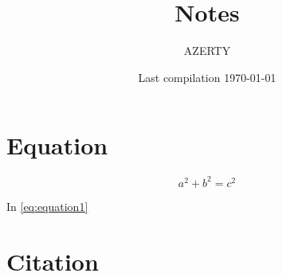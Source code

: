 \documentclass{article}
\begin{document}

\title{Notes
}

\author{AZERTY}



\date{Last compilation \today}

\maketitle
{}

\section{Equation} %
\label{sec:equation}

	\begin{equation}
		\label{eq:equation1}
	  a^2 + b^2 = c^2
	\end{equation}

	In \eqref{eq:equation1}

\section{Citation} %
\label{sec:citation}
	
	\cite{python}
	



\end{document}
